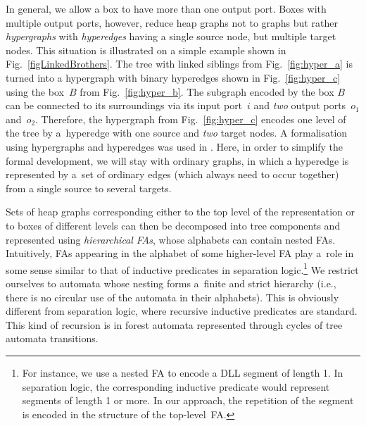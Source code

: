 In general, we allow a box to have more than one output port. Boxes with
multiple output ports, however, reduce heap graphs not to graphs but rather
\emph{hypergraphs} with \emph{hyperedges} having a single source node, but
multiple target nodes. This situation is illustrated on a simple example shown
in Fig.~\ref{figLinkedBrothers}. The tree with linked siblings from
Fig.~\ref{fig:hyper_a} is turned into a hypergraph with binary
hyperedges shown in Fig.~\ref{fig:hyper_c} using the box~$B$ from
Fig.~\ref{fig:hyper_b}. The subgraph encoded by the box $B$ can be
connected to its surroundings via its input port~$i$ and \emph{two} output
ports~$o_1$ and~$o_2$.
Therefore, the hypergraph from Fig.~\ref{fig:hyper_c}
encodes one level of the tree by a~hyperedge with one source and \emph{two}
target nodes.
%
A formalisation using hypergraphs and hyperedges was used in \cite{habermehl:forest}.
Here, in order to simplify the formal development, we will stay with ordinary graphs, 
in which a hyperedge is represented by a~set of ordinary edges (which always
need to occur together) from a single source to several targets.

Sets of heap graphs corresponding either to the  top level of the
representation or to boxes of different levels can then be decomposed into
tree components and represented using \emph{hierarchical FAs}, whose
alphabets can contain nested FAs.
Intuitively, FAs appearing in the alphabet of some higher-level FA play a~role
in some sense similar to that of inductive predicates in  separation
logic.\footnote{For
instance, we use a nested FA to encode a DLL segment of length 1.  In separation
logic, the corresponding inductive predicate would represent segments of length
1 or more. In our approach, the repetition of the segment is encoded in the
structure of the top-level~FA.} We restrict ourselves to automata whose nesting forms
a~finite and strict hierarchy (i.e., there is no circular use of the automata in
their alphabets). 
This is obviously different from separation logic, where recursive inductive predicates are standard.
This kind of recursion is in forest automata represented through cycles of tree automata transitions.







